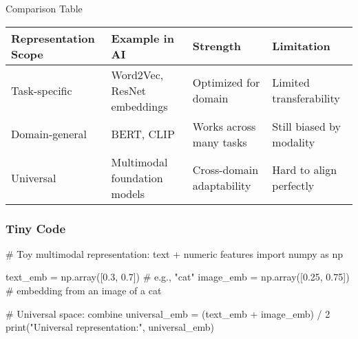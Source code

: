 \documentclass[
  letterpaper,
  DIV=11,
  numbers=noendperiod]{scrreprt}
\newenvironment{Shaded}{\begin{snugshade}}{\end{snugshade}}
\newcommand{\BuiltInTok}[1]{\textcolor[rgb]{0.00,0.23,0.31}{#1}}
\newcommand{\CommentTok}[1]{\textcolor[rgb]{0.37,0.37,0.37}{#1}}
\newcommand{\DecValTok}[1]{\textcolor[rgb]{0.68,0.00,0.00}{#1}}
\newcommand{\FloatTok}[1]{\textcolor[rgb]{0.68,0.00,0.00}{#1}}
\newcommand{\ImportTok}[1]{\textcolor[rgb]{0.00,0.46,0.62}{#1}}
\newcommand{\NormalTok}[1]{\textcolor[rgb]{0.00,0.23,0.31}{#1}}
\newcommand{\OperatorTok}[1]{\textcolor[rgb]{0.37,0.37,0.37}{#1}}
\newcommand{\StringTok}[1]{\textcolor[rgb]{0.13,0.47,0.30}{#1}}
\begin{document}
Comparison Table

\begin{longtable}[]{@{}
  >{\raggedright\arraybackslash}p{}
  >{\raggedright\arraybackslash}p{}
  >{\raggedright\arraybackslash}p{}
  >{\raggedright\arraybackslash}p{}@{}}
\toprule\noalign{}
\begin{minipage}[b]{\linewidth}\raggedright
Representation Scope
\end{minipage} & \begin{minipage}[b]{\linewidth}\raggedright
Example in AI
\end{minipage} & \begin{minipage}[b]{\linewidth}\raggedright
Strength
\end{minipage} & \begin{minipage}[b]{\linewidth}\raggedright
Limitation
\end{minipage} \\
\midrule\noalign{}
\endhead
\bottomrule\noalign{}
\endlastfoot
Task-specific & Word2Vec, ResNet embeddings & Optimized for domain &
Limited transferability \\
Domain-general & BERT, CLIP & Works across many tasks & Still biased by
modality \\
Universal & Multimodal foundation models & Cross-domain adaptability &
Hard to align perfectly \\
\end{longtable}

\subsubsection{Tiny Code}\label{tiny-code-49}

\begin{Shaded}
\begin{Highlighting}[]
\CommentTok{\# Toy multimodal representation: text + numeric features}
\ImportTok{import}\NormalTok{ numpy }\ImportTok{as}\NormalTok{ np}

\NormalTok{text\_emb }\OperatorTok{=}\NormalTok{ np.array([}\FloatTok{0.3}\NormalTok{, }\FloatTok{0.7}\NormalTok{])   }\CommentTok{\# e.g., "cat"}
\NormalTok{image\_emb }\OperatorTok{=}\NormalTok{ np.array([}\FloatTok{0.25}\NormalTok{, }\FloatTok{0.75}\NormalTok{]) }\CommentTok{\# embedding from an image of a cat}

\CommentTok{\# Universal space: combine}
\NormalTok{universal\_emb }\OperatorTok{=}\NormalTok{ (text\_emb }\OperatorTok{+}\NormalTok{ image\_emb) }\OperatorTok{/} \DecValTok{2}
\BuiltInTok{print}\NormalTok{(}\StringTok{"Universal representation:"}\NormalTok{, universal\_emb)}
\end{Highlighting}
\end{Shaded}
\end{document}
